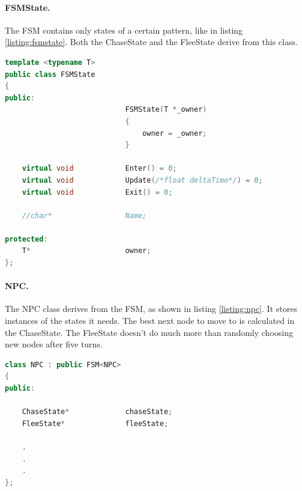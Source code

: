\documentclass[12pt]{article}
\begin{document}
\paragraph{FSMState.}

The FSM contains only states of a certain pattern, like in listing \ref{listing:fsmstate}. Both the ChaseState and the FleeState derive from this class.

\begin{lstlisting}[caption=A finite state machine state.,label=listing:fsmstate,language=C++]
template <typename T>
public class FSMState
{
public:
							FSMState(T *_owner)
							{
								owner = _owner;
							}

	virtual void			Enter() = 0;
	virtual void			Update(/*float deltaTime*/) = 0;
	virtual void			Exit() = 0;

	//char*					Name;

protected:
	T*						owner;
};
\end{lstlisting}

\paragraph{NPC.}
The NPC class derives from the FSM, as shown in listing \ref{listing:npc}. It stores instances of the states it needs. The best next node to move to is calculated in the ChaseState. The FleeState doesn't do much more than randomly choosing new nodes after five turns.

\begin{lstlisting}[caption=Curiously recurring template pattern., label=listing:npc,language=C++]
class NPC : public FSM<NPC>
{
public:

	ChaseState*				chaseState;
	FleeState*				fleeState;
	
	.
	.
	.
};
\end{lstlisting}

\lstlistoflistings
\listoffigures
\end{document}

